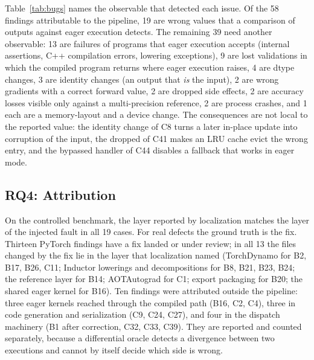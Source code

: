 Table~\ref{tab:bugs} names the observable that detected each issue. Of the 58
findings attributable to the pipeline, 19 are wrong values that a comparison of outputs against eager execution
detects. The remaining 39 need another observable: 13 are failures of programs that eager execution accepts
(internal assertions, C++ compilation errors, lowering exceptions), 9 are lost validations in which the compiled
program returns where eager execution raises, 4 are dtype changes, 3 are identity changes (an output that
\emph{is} the input), 2 are wrong gradients with a correct forward value, 2 are dropped side effects, 2 are
accuracy losses visible only against a multi-precision reference, 2 are process crashes, and 1 each are a
memory-layout and a device change. The consequences are not local to the reported value: the identity change of C8 turns a later in-place
update into corruption of the input, the dropped  of C41 makes an LRU cache evict the
wrong entry, and the bypassed handler of C44 disables a fallback that works in eager mode.


\subsection{RQ4: Attribution}
\label{sec:rq4}

On the controlled benchmark, the layer reported by localization matches the layer of the injected fault in all
19 cases. For real defects the ground truth is the fix. Thirteen PyTorch findings have a fix landed or under
review; in all 13 the files changed by the fix lie in the layer that localization named (TorchDynamo for B2,
B17, B26, C11; Inductor lowerings and decompositions for B8, B21, B23, B24; the reference layer for B14;
AOTAutograd for C1; export packaging for B20; the shared eager kernel for B16). Ten findings were attributed outside the pipeline: three eager kernels reached through the compiled
path (B16, C2, C4), three in  code generation and serialization (C9, C24, C27), and four in the
dispatch machinery (B1 after correction, C32, C33, C39). They are reported and counted separately, because a
differential oracle detects a divergence between two executions and cannot by itself decide which side is
wrong.


